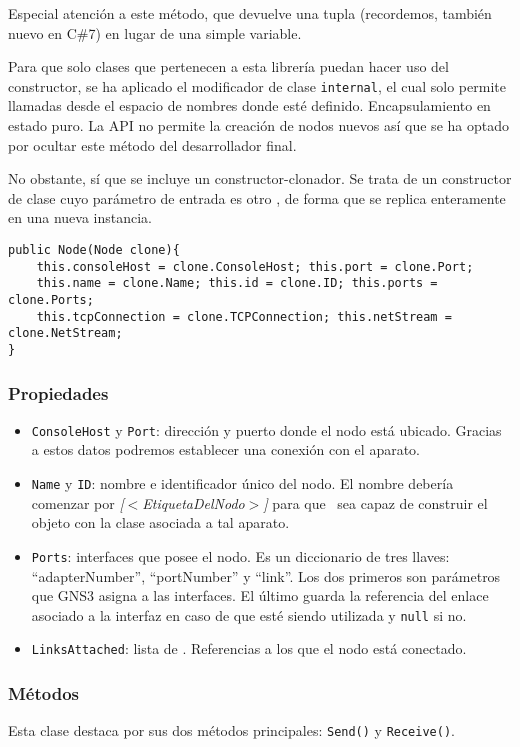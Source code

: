 Especial atención a este método, que devuelve una tupla (recordemos, también nuevo en C\#7) en lugar de una simple variable.

Para que solo clases que pertenecen a esta librería puedan hacer uso del constructor, se ha aplicado el modificador de clase \texttt{internal}, el cual solo permite llamadas desde el espacio de nombres donde esté definido. Encapsulamiento en estado puro. La API no permite la creación de nodos nuevos así que se ha optado por ocultar este método del desarrollador final.

No obstante, sí que se incluye un constructor-clonador. Se trata de un constructor de clase cuyo parámetro de entrada es otro \NODE, de forma que se replica enteramente en una nueva instancia.

\begin{lstlisting}[language={[Sharp]C}, caption={Clonador de nodos}, label={node2}]
public Node(Node clone){
    this.consoleHost = clone.ConsoleHost; this.port = clone.Port;
    this.name = clone.Name; this.id = clone.ID; this.ports = clone.Ports;
    this.tcpConnection = clone.TCPConnection; this.netStream = clone.NetStream;
}
\end{lstlisting}

\subsubsection{Propiedades}
\begin{itemize}
\item \texttt{ConsoleHost} y \texttt{Port}: dirección y puerto donde el nodo está ubicado. Gracias a estos datos podremos establecer una conexión con el aparato.
\item \texttt{Name} y \texttt{ID}: nombre e identificador único del nodo. El nombre debería comenzar por \textit{[$<$EtiquetaDelNodo$>$]} para que \GNSCS~sea capaz de construir el objeto con la clase asociada a tal aparato.
\item \texttt{Ports}: interfaces que posee el nodo. Es un diccionario de tres llaves: ``adapterNumber'', ``portNumber'' y ``link''. Los dos primeros son parámetros que GNS3 asigna a las interfaces. El último guarda la referencia del enlace asociado a la interfaz en caso de que esté siendo utilizada y \texttt{null} si no.
\item \texttt{LinksAttached}: lista de \LINK. Referencias a los que el nodo está conectado.
\end{itemize}

\subsubsection{Métodos}
Esta clase destaca por sus dos métodos principales: \texttt{Send()} y \texttt{Receive()}.

